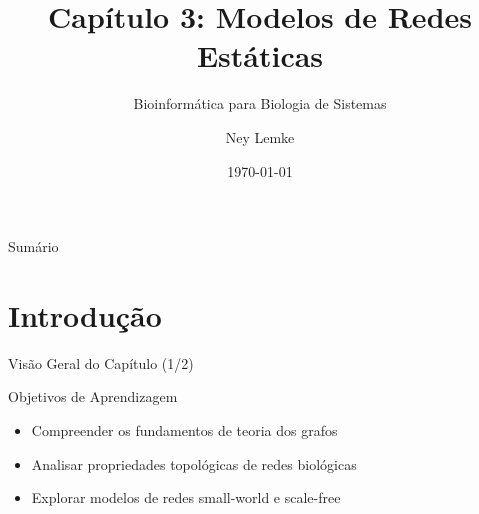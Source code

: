 


\title[Cap. 3: Modelos de Redes Estáticas]{Capítulo 3: Modelos de Redes Estáticas}
\subtitle{Bioinformática para Biologia de Sistemas}
\author{Ney Lemke}
\date{\today}



\begin{frame}
\titlepage
\end{frame}

\begin{frame}{Sumário}
\tableofcontents
\end{frame}

\section{Introdução}

\begin{frame}[shrink=10]{Visão Geral do Capítulo (1/2)}
\begin{block}{Objetivos de Aprendizagem}
\begin{itemize}
    \item Compreender os fundamentos de teoria dos grafos
    \item Analisar propriedades topológicas de redes biológicas
    \item Explorar modelos de redes small-world e scale-free
\end{itemize}
\end{block}
\end{frame}

